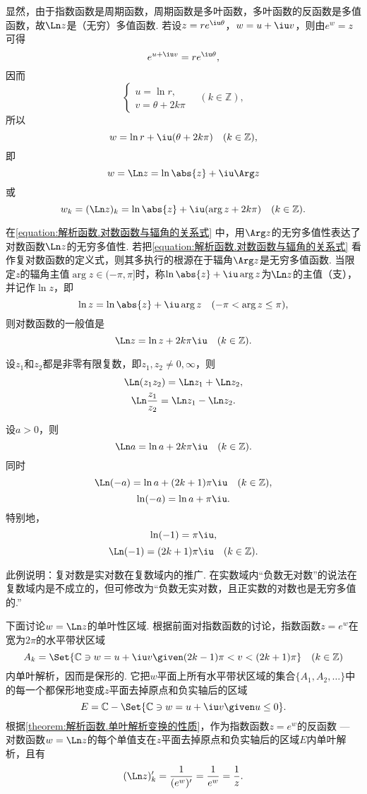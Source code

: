 显然，由于指数函数是周期函数，周期函数是多叶函数，多叶函数的反函数是多值函数，故\(\Ln z\)是（无穷）多值函数.
若设\(z = r e^{\iu\theta}\)，\(w = u + \iu v\)，则由\(e^w = z\)可得\[
e^{u + \iu v} = r e^{\iu\theta},
\]因而\[
\left\{ \begin{array}{l}
u = \ln r, \\
v = \theta+2k\pi
\end{array} \right.
\quad(k\in\mathbb{Z}),
\]所以\[
w = \ln r + \iu(\theta+2k\pi)
\quad(k\in\mathbb{Z}),
\]即\begin{equation}\label{equation:解析函数.对数函数与辐角的关系式}
w = \Ln z = \ln\abs{z} + \iu \Arg z
\end{equation}或\[
w_k = (\Ln z)_k = \ln\abs{z} + \iu(\arg z + 2k\pi)
\quad(k\in\mathbb{Z}).
\]

在\cref{equation:解析函数.对数函数与辐角的关系式} 中，用\(\Arg z\)的无穷多值性表达了对数函数\(\Ln z\)的无穷多值性.
若把\cref{equation:解析函数.对数函数与辐角的关系式} 看作复对数函数的定义式，则其多执行的根源在于辐角\(\Arg z\)是无穷多值函数.
当限定\(z\)的辐角主值\(\arg z \in (-\pi,\pi]\)时，称\(\ln\abs{z}+\iu\arg z\)为\(\Ln z\)的主值（支），并记作\(\ln z\)，即\begin{equation}\label{equation:解析函数.对数函数的主值支}
\ln z = \ln\abs{z} + \iu\arg z
\quad(-\pi < \arg z \leq \pi),
\end{equation}则对数函数的一般值是\[
\Ln z = \ln z + 2k\pi\iu
\quad(k\in\mathbb{Z}).
\]

\begin{theorem}
设\(z_1\)和\(z_2\)都是非零有限复数，即\(z_1,z_2\neq0,\infty\)，则\begin{gather}
\Ln(z_1 z_2) = \Ln z_1 + \Ln z_2, \\
\Ln \frac{z_1}{z_2} = \Ln z_1 - \Ln z_2.
\end{gather}
\end{theorem}

\begin{example}
设\(a > 0\)，则\[
\Ln a = \ln a + 2k\pi\iu \quad(k\in\mathbb{Z}).
\]同时\[
\Ln(-a) = \ln a + (2k+1)\pi\iu \quad(k\in\mathbb{Z}),
\]\[
\ln(-a) = \ln a + \pi\iu.
\]特别地，\[
\ln(-1) = \pi\iu,
\]\[
\Ln(-1) = (2k+1)\pi\iu \quad(k\in\mathbb{Z}).
\]
\end{example}
此例说明：复对数是实对数在复数域内的推广.
在实数域内“负数无对数”的说法在复数域内是不成立的，但可修改为“负数无实对数，且正实数的对数也是无穷多值的.”

下面讨论\(w = \Ln z\)的单叶性区域.
根据前面对指数函数的讨论，指数函数\(z = e^w\)在宽为\(2\pi\)的水平带状区域\[
A_k = \Set{ \mathbb{C} \ni w = u + \iu v \given (2k-1)\pi < v < (2k+1)\pi }
\quad(k\in\mathbb{Z})
\]内单叶解析，因而是保形的.
它把\(w\)平面上所有水平带状区域的集合\(\{A_1,A_2,\dotsc\}\)中的每一个都保形地变成\(z\)平面去掉原点和负实轴后的区域\[
E = \mathbb{C} - \Set{ \mathbb{C} \ni w = u + \iu v \given u \leq 0 }.
\]
根据\cref{theorem:解析函数.单叶解析变换的性质}，作为指数函数\(z = e^w\)的反函数 --- 对数函数\(w = \Ln z\)的每个单值支在\(z\)平面去掉原点和负实轴后的区域\(E\)内单叶解析，且有\begin{equation}
(\Ln z)'_k = \frac{1}{(e^w)'} = \frac{1}{e^w} = \frac{1}{z}.
\end{equation}

